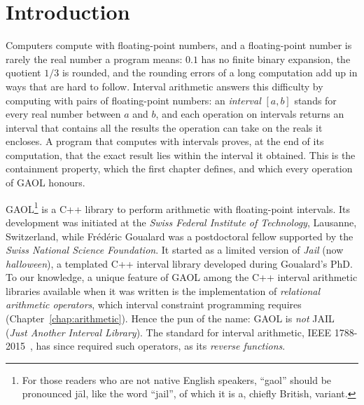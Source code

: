 \chapter*{Introduction}\label{chap:introduction}
\thispagestyle{plain}

Computers compute with floating-point numbers, and a floating-point number
is rarely the real number a program means: $0.1$ has no finite binary
expansion, the quotient $1/3$ is rounded, and the rounding errors of a long
computation add up in ways that are hard to follow. Interval arithmetic
answers this difficulty by computing with pairs of floating-point numbers:
an \emph{interval} $[a, b]$ stands for every real number between $a$ and
$b$, and each operation on intervals returns an interval that contains all
the results the operation can take on the reals it encloses. A program that
computes with intervals proves, at the end of its computation, that the
exact result lies within the interval it obtained. This is the containment
property, which the first chapter defines, and which every operation of GAOL
honours.

\medskip
GAOL\footnote{For those readers who are not native English speakers,
``gaol'' should be pronounced \textsf{j\={a}l}, like the word ``jail'', of
which it is a, chiefly British, variant.}
%
is a C++ library to perform arithmetic with floating-point intervals. Its
development was initiated at the \emph{Swiss Federal Institute of
Technology}, Lausanne, Switzerland, while Fr\'ed\'eric Goualard was a
postdoctoral fellow supported by the \emph{Swiss National Science
Foundation}. It started as a limited version of \emph{Jail} (now
\emph{halloween}), a templated C++ interval library developed during
Goualard's PhD. To our knowledge, a unique feature of GAOL among the C++
interval arithmetic libraries available when it was written is the
implementation of \emph{relational arithmetic operators}, which interval
constraint programming requires (Chapter~\ref{chap:arithmetic}).
%
Hence the pun of the name: GAOL is \emph{not} JAIL (\emph{Just Another
Interval Library}). The standard for interval arithmetic, IEEE
1788-2015~\cite{IEEE1788:2015}, has since required such operators, as its
\emph{reverse functions}.
%

